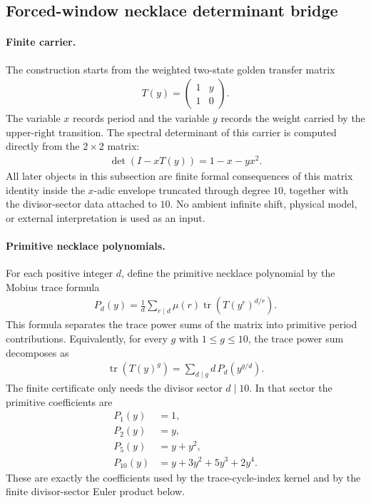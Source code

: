 
\subsection{Forced-window necklace determinant bridge}
\label{sec:window6-clock-gauge-invariant-necklace-spectral-determinant-bridge}

\paragraph{Finite carrier.}
The construction starts from the weighted two-state golden transfer matrix
$$
\begin{aligned}
T(y)=\begin{pmatrix}1&y\\1&0\end{pmatrix}.
\end{aligned}
$$
The variable $x$ records period and the variable $y$ records the weight carried by the upper-right transition. The spectral determinant of this carrier is computed directly from the $2\times 2$ matrix:
$$
\begin{aligned}
\det(I-xT(y))=1-x-yx^2.
\end{aligned}
$$
All later objects in this subsection are finite formal consequences of this matrix identity inside the $x$-adic envelope truncated through degree $10$, together with the divisor-sector data attached to $10$. No ambient infinite shift, physical model, or external interpretation is used as an input.

\paragraph{Primitive necklace polynomials.}
For each positive integer $d$, define the primitive necklace polynomial by the Mobius trace formula
$$
\begin{aligned}
P_d(y)=\frac{1}{d}\sum_{r\mid d}\mu(r)\operatorname{tr}\left(T(y^r)^{d/r}\right).
\end{aligned}
$$
This formula separates the trace power sums of the matrix into primitive period contributions. Equivalently, for every $g$ with $1\leq g\leq 10$, the trace power sum decomposes as
$$
\begin{aligned}
\operatorname{tr}(T(y)^g)=\sum_{d\mid g} d\,P_d\left(y^{g/d}\right).
\end{aligned}
$$
The finite certificate only needs the divisor sector $d\mid 10$. In that sector the primitive coefficients are
$$
\begin{aligned}
P_1(y)&=1,\\
P_2(y)&=y,\\
P_5(y)&=y+y^2,\\
P_{10}(y)&=y+3y^2+5y^3+2y^4.
\end{aligned}
$$
These are exactly the coefficients used by the trace-cycle-index kernel and by the finite divisor-sector Euler product below.

